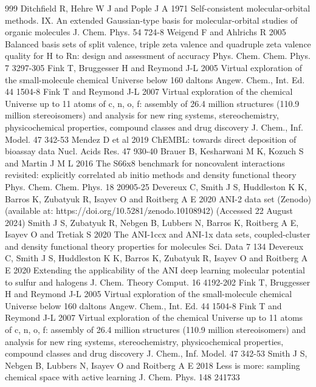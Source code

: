 \documentclass[12pt]{article}
\begin{document}
\begin{thebibliography}{999}
 Ditchfield R, Hehre W J and Pople J A 1971 Self-consistent molecular-orbital methods. IX. An extended Gaussian-type basis for molecular-orbital studies of organic molecules J. Chem. Phys. 54 724-8
 Weigend F and Ahlrichs R 2005 Balanced basis sets of split valence, triple zeta valence and quadruple zeta valence quality for H to Rn: design and assessment of accuracy Phys. Chem. Chem. Phys. 7 3297-305
 Fink T, Bruggesser H and Reymond J-L 2005 Virtual exploration of the small-molecule chemical Universe below 160 daltons Angew. Chem., Int. Ed. 44 1504-8
 Fink T and Reymond J-L 2007 Virtual exploration of the chemical Universe up to 11 atoms of c, n, o, f: assembly of 26.4 million structures (110.9 million stereoisomers) and analysis for new ring systems, stereochemistry, physicochemical properties, compound classes and drug discovery J. Chem., Inf. Model. 47 342-53
 Mendez D et al 2019 ChEMBL: towards direct deposition of bioassay data Nucl. Acids Res. 47 930-40
 Brauer B, Kesharwani M K, Kozuch S and Martin J M L 2016 The S66x8 benchmark for noncovalent interactions revisited: explicitly correlated ab initio methods and density functional theory Phys. Chem. Chem. Phys. 18 20905-25
 Devereux C, Smith J S, Huddleston K K, Barros K, Zubatyuk R, Isayev O and Roitberg A E 2020 ANI-2 data set (Zenodo) (available at: https://doi.org/10.5281/zenodo.10108942) (Accessed 22 August 2024)
 Smith J S, Zubatyuk R, Nebgen B, Lubbers N, Barros K, Roitberg A E, Isayev O and Tretiak S 2020 The ANI-1ccx and ANI-1x data sets, coupled-cluster and density functional theory properties for molecules Sci. Data 7 134
 Devereux C, Smith J S, Huddleston K K, Barros K, Zubatyuk R, Isayev O and Roitberg A E 2020 Extending the applicability of the ANI deep learning molecular potential to sulfur and halogens J. Chem. Theory Comput. 16 4192-202
 Fink T, Bruggesser H and Reymond J-L 2005 Virtual exploration of the small-molecule chemical Universe below 160 daltons Angew. Chem., Int. Ed. 44 1504-8
 Fink T and Reymond J-L 2007 Virtual exploration of the chemical Universe up to 11 atoms of c, n, o, f: assembly of 26.4 million structures (110.9 million stereoisomers) and analysis for new ring systems, stereochemistry, physicochemical properties, compound classes and drug discovery J. Chem., Inf. Model. 47 342-53
 Smith J S, Nebgen B, Lubbers N, Isayev O and Roitberg A E 2018 Less is more: sampling chemical space with active learning J. Chem. Phys. 148 241733

\end{thebibliography}
\end{document}
